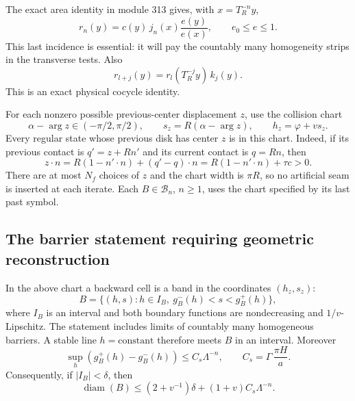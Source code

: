 The exact area identity in module 313 gives, with
$x=T_R^{-n}y$,
\begin{equation}\label{eq:wp-area}
 r_n(y)=c(y)\,j_n(x)\frac{e(y)}{e(x)},\qquad
       e_0\le e\le1.
\end{equation}
This last incidence is essential: it will pay the countably many
homogeneity strips in the transverse tests.
Also
\[
 r_{l+j}(y)=
 r_l(T_R^{-j}y)\,k_j(y).
\]
This is an exact physical cocycle identity.

For each nonzero possible previous-center displacement $z$, use the
collision chart
\[
 \alpha-\arg z\in(-\pi/2,\pi/2),\qquad
 s_z=R(\alpha-\arg z),\qquad
 h_z=\varphi+v s_z.
\]
Every regular state whose previous disk has center $z$ is in this chart.
Indeed, if its previous contact is $q'=z+R n'$ and its current contact
is $q=Rn$, then
\[
 z\cdot n=R(1-n'\cdot n)+(q'-q)\cdot n
         =R(1-n'\cdot n)+\tau c>0.
\]
There are at most $N_f$ choices of $z$ and the chart width is $\pi R$,
so no artificial seam is inserted at each iterate.
Each $B\in\mathcal B_n$, $n\ge1$, uses the chart specified by its
last past symbol.

\subsection{The barrier statement requiring geometric reconstruction}

\begin{lemma}
\label{lem:wp-barriers}
In the above chart a backward cell is a band in the coordinates
$(h_z,s_z)$:
\[
 B=\{(h,s):h\in I_B,\ g_B^-(h)<s<g_B^+(h)\},
\]
where $I_B$ is an interval and both boundary functions are
nondecreasing and $1/v$-Lipschitz.
The statement includes limits of countably many homogeneous barriers.
A stable line $h=\mathrm{constant}$ therefore meets $B$ in an interval.
Moreover
\begin{equation}\label{eq:wp-fibre}
 \sup_h(g_B^+(h)-g_B^-(h))
 \le C_s\Lambda^{-n},\qquad
 C_s=\Gamma\,\frac{\pi H}{a}.
\end{equation}
Consequently, if $|I_B|<\delta$, then
\begin{equation}\label{eq:wp-diameter}
 \operatorname{diam}(B)
 \le(2+v^{-1})\delta+(1+v)C_s\Lambda^{-n}.
\end{equation}
\end{lemma}

